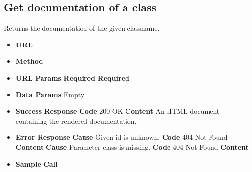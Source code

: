 \subsection{Get documentation of a class}
Returns the documentation of the given classname.
\begin{itemize}
\item \textbf{URL} 
\item \textbf{Method} 

\item \textbf{URL Params}
  \newline\textbf{Required} 
  \newline\textbf{Required} 

\item \textbf{Data Params} Empty
\item \textbf{Success Response}
  \newline\textbf{Code} 200 OK
  \newline\textbf{Content} An HTML-document containing the rendered documentation.

\item \textbf{Error Response}
  \newline\textbf{Cause} Given id is unknown.
  \newline\textbf{Code} 404 Not Found
  \newline\textbf{Content} 
  \newline\textbf{Cause} Parameter class is missing.
  \newline\textbf{Code} 404 Not Found
  \newline\textbf{Content} 

\item \textbf{Sample Call}
\end{itemize}
